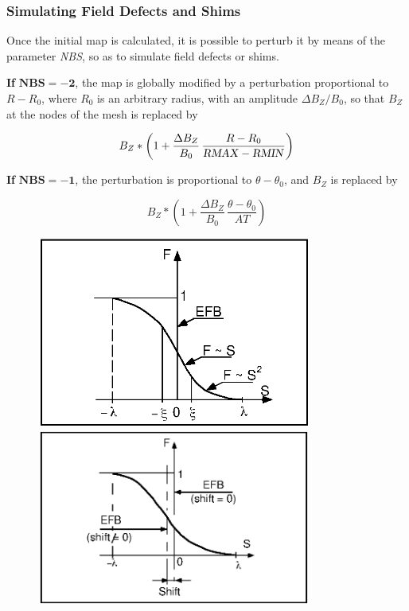 { 
 \subsubsection*{Simulating Field Defects and Shims } 
 
  Once the initial map is calculated, it is possible to perturb it by
means of the parameter \textsl{NBS}, so as to simulate field defects or shims. 
\bigskip

\noindent\textbf{If} $\mathbf{NBS = -2}$, the map is globally modified by a
perturbation proportional to $ R-R_0 $, where $ R_0 $ is an arbitrary radius, 
with an amplitude $ \Delta B_Z/B_0 $, so that $ B_Z $ at the nodes of the mesh is replaced by 

$$ B_Z \ast  \left( 1+ \dfrac{\Delta B_Z }{ B_0} \,
                 \dfrac{R-R_0 }{\text{\textsl{RMAX}} - \text{\textsl{RMIN}}} \right) $$


\noindent\textbf{If} $\mathbf{NBS = -1}$, the perturbation is proportional to
$ \theta -\theta_ 0 $, and $ B_Z $ is replaced by 

$$ B_Z \ast  \left(1+ \dfrac{\Delta B_Z }{ B_0}\, \dfrac {\theta -\theta_ 0 }{ AT}\right) $$


\newpage

\begin{figure}[H]
  \centering
  \includegraphics[width=9cm]{Fig10.ps}
  \vfill
  \includegraphics[width=9cm]{Fig11.ps}
{\setlength{\captionwidth}{10cm}
}
\end{figure}

}
